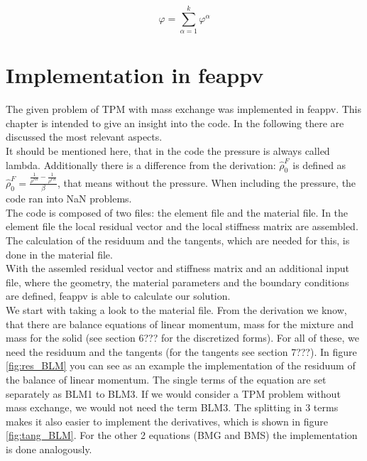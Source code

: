 \documentclass[12pt]{article}
\begin{document}
$$\varphi = \sum_{\alpha=1}^{k}\varphi^\alpha $$




\section{\huge{Implementation in feappv}}

The given problem of TPM with mass exchange was implemented in feappv. This chapter is intended to give an insight into the code. In the following there are discussed the most relevant aspects. \\
It should be mentioned here, that in the code the pressure is always called lambda. Additionally there is a difference from the derivation: $\hat{\rho}_{0}^{F}$ is defined as $\hat{\rho}_{0}^{F} = \frac{\frac{1}{\rho^{SR}}-\frac{1}{\rho^{FR}}}{\beta}$, that means without the pressure. When including the pressure, the code ran into NaN problems.\\

The code is composed of two files: the element file and the material file. In the element file the local residual vector and the local stiffness matrix are assembled. The calculation of the residuum and the tangents, which are needed for this, is done in the material file. \\
With the assemled residual vector and stiffness matrix and an additional input file, where the geometry, the material parameters and the boundary conditions are defined, feappv is able to calculate our solution. \\ 

We start with taking a look to the material file. From the derivation we know, that there are balance equations of linear momentum, mass for the mixture and mass for the solid (see section 6??? for the discretized forms). For all of these, we need the residuum and the tangents (for the tangents see section 7???). In figure \ref{fig:res_BLM} you can see as an example the implementation of the residuum of the balance of linear momentum. The single terms of the equation are set separately as BLM1 to BLM3. If we would consider a TPM problem without mass exchange, we would not need the term BLM3. The splitting in 3 terms makes it also easier to implement the derivatives, which is shown in figure \ref{fig:tang_BLM}. For the other 2 equations (BMG and BMS) the implementation is done analogously. \\
\end{document}
